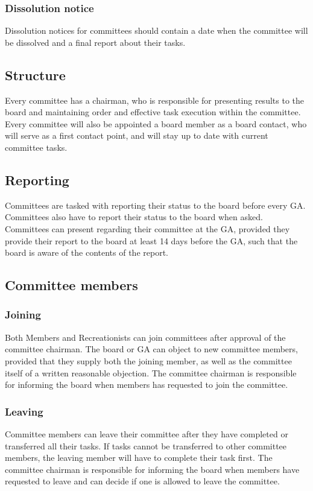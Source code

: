 \documentclass[a4paper]{article}
\begin{document}
\subsubsection{Dissolution notice}
Dissolution notices for committees should contain a date when the committee will be dissolved and a final report about their tasks.

\subsection{Structure}
Every committee has a chairman, who is responsible for presenting results to the board and maintaining order and effective task execution within the committee. Every committee will also be appointed a board member as a board contact, who will serve as a first contact point, and will stay up to date with current committee tasks.

\subsection{Reporting}
Committees are tasked with reporting their status to the board before every GA. Committees also have to report their status to the board when asked. Committees can present regarding their committee at the GA, provided they provide their report to the board at least 14 days before the GA, such that the board is aware of the contents of the report.

\subsection{Committee members}
\subsubsection{Joining}
Both Members and Recreationists can join committees after approval of the committee chairman. The board or GA can object to new committee members, provided that they supply both the joining member, as well as the committee itself of a written reasonable objection. The committee chairman is responsible for informing the board when members has requested to join the committee.

\subsubsection{Leaving}
Committee members can leave their committee after they have completed or transferred all their tasks. If tasks cannot be transferred to other committee members, the leaving member will have to complete their task first. The committee chairman is responsible for informing the board when members have requested to leave and can decide if one is allowed to leave the committee. \\ 
\end{document}
